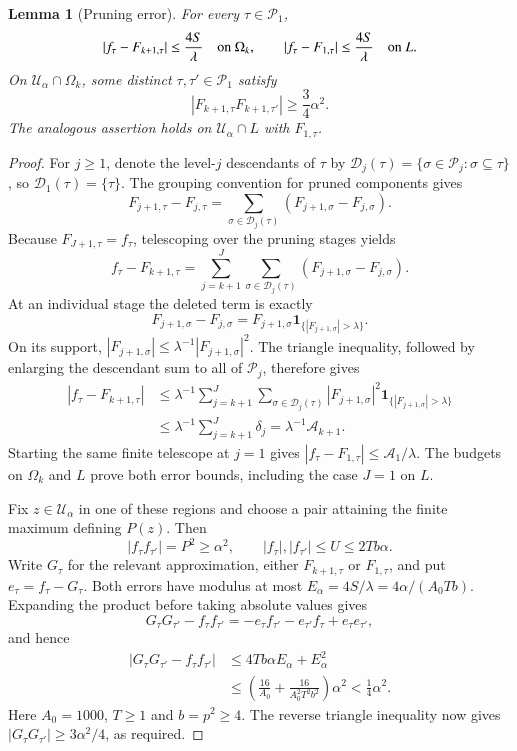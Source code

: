 \documentclass[11pt,twoside,a4paper]{article}
\numberwithin{equation}{section}
\newtheorem{lemma}[theorem]{Lemma}
\theoremstyle{definition}
\newcommand{\one}{\mathbf 1}
\newcommand{\cP}{\mathcal P}
\begin{document}
\begin{lemma}[Pruning error]\label{lem:pruning-error}
For every $\tau\in\cP_1$,
$$
|f_\tau-F_{k+1,\tau}|\le\frac{4S}{\lambda}
\quad\hbox{on }\Omega_k,\qquad
|f_\tau-F_{1,\tau}|\le\frac{4S}{\lambda}\quad\hbox{on }L.
$$
On $\mathcal U_\alpha\cap\Omega_k$, some distinct $\tau,\tau'\in\cP_1$ satisfy
$$
|F_{k+1,\tau}F_{k+1,\tau'}|\ge\frac34\alpha^2.
$$
The analogous assertion holds on $\mathcal U_\alpha\cap L$ with $F_{1,\tau}$.
\end{lemma}
\begin{proof}
For $j\ge1$, denote the level-$j$ descendants of $\tau$ by $\mathcal D_j(\tau)=\{\sigma\in\cP_j:\sigma\subseteq\tau\}$, so $\mathcal D_1(\tau)=\{\tau\}$. The grouping convention for pruned components gives
$$
F_{j+1,\tau}-F_{j,\tau}
=\sum_{\sigma\in\mathcal D_j(\tau)}(F_{j+1,\sigma}-F_{j,\sigma}).
$$
Because $F_{J+1,\tau}=f_\tau$, telescoping over the pruning stages yields
$$
f_\tau-F_{k+1,\tau}
=\sum_{j=k+1}^J\sum_{\sigma\in\mathcal D_j(\tau)}
(F_{j+1,\sigma}-F_{j,\sigma}).
$$
At an individual stage the deleted term is exactly
$$
F_{j+1,\sigma}-F_{j,\sigma}
=F_{j+1,\sigma}\one_{\{|F_{j+1,\sigma}|>\lambda\}}.
$$
On its support, $|F_{j+1,\sigma}|\le\lambda^{-1}|F_{j+1,\sigma}|^2$. The triangle inequality, followed by enlarging the descendant sum to all of $\cP_j$, therefore gives
$$
\begin{aligned}
|f_\tau-F_{k+1,\tau}|
&\le\lambda^{-1}\sum_{j=k+1}^J\sum_{\sigma\in\mathcal D_j(\tau)}
|F_{j+1,\sigma}|^2\one_{\{|F_{j+1,\sigma}|>\lambda\}}\\
&\le\lambda^{-1}\sum_{j=k+1}^J\delta_j
=\lambda^{-1}\mathcal A_{k+1}.
\end{aligned}
$$
Starting the same finite telescope at $j=1$ gives $|f_\tau-F_{1,\tau}|\le\mathcal A_1/\lambda$. The budgets on $\Omega_k$ and $L$ prove both error bounds, including the case $J=1$ on $L$.

Fix $z\in\mathcal U_\alpha$ in one of these regions and choose a pair attaining the finite maximum defining $P(z)$. Then
$$
|f_\tau f_{\tau'}|=P^2\ge\alpha^2,
\qquad |f_\tau|,|f_{\tau'}|\le U\le2Tb\alpha.
$$
Write $G_\tau$ for the relevant approximation, either $F_{k+1,\tau}$ or $F_{1,\tau}$, and put $e_\tau=f_\tau-G_\tau$. Both errors have modulus at most $E_\alpha=4S/\lambda=4\alpha/(A_0Tb)$. Expanding the product before taking absolute values gives
$$
G_\tau G_{\tau'}-f_\tau f_{\tau'}
=-e_\tau f_{\tau'}-e_{\tau'}f_\tau+e_\tau e_{\tau'},
$$
and hence
$$
\begin{aligned}
|G_\tau G_{\tau'}-f_\tau f_{\tau'}|
&\le4Tb\alpha E_\alpha+E_\alpha^2\\
&\le\left(\frac{16}{A_0}+\frac{16}{A_0^2T^2b^2}\right)\alpha^2
<\frac14\alpha^2.
\end{aligned}
$$
Here $A_0=1000$, $T\ge1$ and $b=p^2\ge4$. The reverse triangle inequality now gives $|G_\tau G_{\tau'}|\ge3\alpha^2/4$, as required.
\end{proof}
\end{document}
